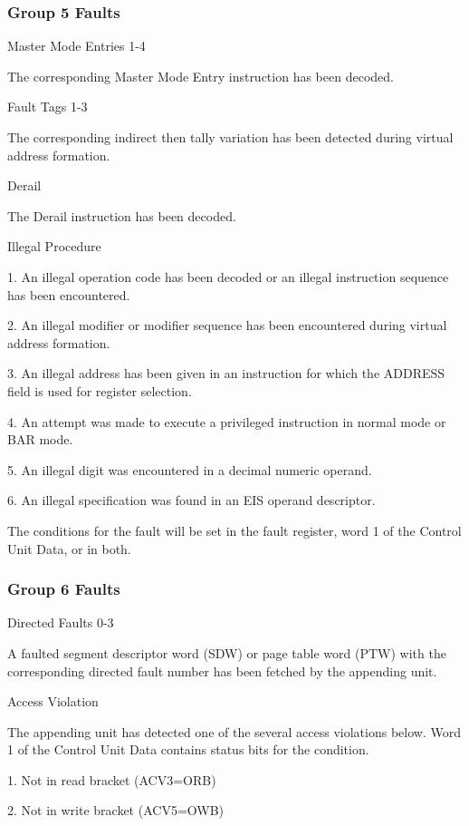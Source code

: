 \subsubsection{Group 5 Faults}

Master Mode Entries 1-4

The corresponding Master Mode Entry instruction has been decoded.

Fault Tags 1-3

The corresponding indirect then tally variation has been detected during
virtual address formation.  

Derail

The Derail instruction has been decoded.

Illegal Procedure

1. An illegal operation code has been decoded or an illegal instruction
sequence has been encountered.


2. An illegal modifier or modifier sequence has been encountered during virtual 
address formation.


3. An illegal address has been given in an instruction for which the ADDRESS
field is used for register selection.


4. An attempt was made to execute a privileged instruction in normal mode or
BAR mode.  

5. An illegal digit was encountered in a decimal numeric operand.

6. An illegal specification was found in an EIS operand descriptor.


The conditions for the fault will be set in the fault register, word 1 of the
Control Unit Data, or in both.

\subsubsection{Group 6 Faults}

Directed Faults 0-3


A faulted segment descriptor word (SDW) or page table word (PTW) with the
corresponding directed fault number has been fetched by the appending unit.  

Access Violation

The appending unit has detected one of the several access violations below.
Word 1 of the Control Unit Data contains status bits for the condition.

1. Not in read bracket (ACV3=ORB)

2. Not in write bracket (ACV5=OWB)

